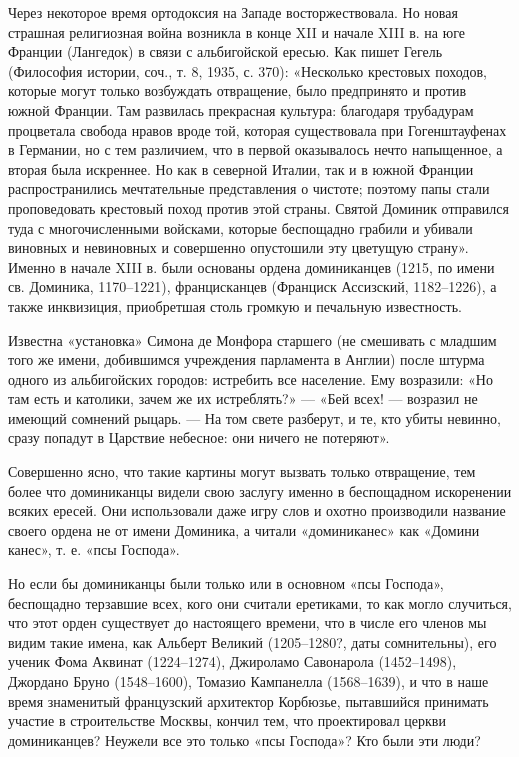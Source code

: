Через некоторое время ортодоксия  на Западе восторжествовала. Но новая
страшная религиозная  война возникла в конце  XII и начале XIII  в. на
юге  Франции  (Лангедок) в  связи  с  альбигойской ересью.  Как  пишет
Гегель  (Философия истории,  соч.,  т. 8,  1935,  с. 370):  «Несколько
крестовых походов,  которые могут  только возбуждать  отвращение, было
предпринято и против южной Франции. Там развилась прекрасная культура:
благодаря  трубадурам процветала  свобода  нравов  вроде той,  которая
существовала при Гогенштауфенах в Германии,  но с тем различием, что в
первой  оказывалось  нечто напыщенное,  а  вторая  была искреннее.  Но
как  в  северной  Италии,  так  и  в  южной  Франции  распространились
мечтательные представления о чистоте; поэтому папы стали проповедовать
крестовый  поход против  этой страны.  Святой Доминик  отправился туда
с  многочисленными  войсками,  которые беспощадно  грабили  и  убивали
виновных и  невиновных и  совершенно опустошили эту  цветущую страну».
Именно в  начале XIII в.  были основаны ордена доминиканцев  (1215, по
имени  св. Доминика,  1170--1221), францисканцев  (Франциск Ассизский,
1182--1226), а также инквизиция, приобретшая столь громкую и печальную
известность.

Известна  «установка»  Симона  де  Монфора старшего  (не  смешивать  с
младшим  того же  имени,  добившимся учреждения  парламента в  Англии)
после штурма одного из  альбигойских городов: истребить все население.
Ему возразили: «Но  там есть и католики, зачем же  их истреблять?» ---
«Бей всех! ---  возразил не имеющий сомнений рыцарь. ---  На том свете
разберут, и те, кто убиты  невинно, сразу попадут в Царствие небесное:
они ничего не потеряют».

Совершенно ясно,  что такие  картины могут вызвать  только отвращение,
тем более  что доминиканцы  видели свою  заслугу именно  в беспощадном
искоренении всяких  ересей. Они использовали  даже игру слов  и охотно
производили  название своего  ордена не  от имени  Доминика, а  читали
«доминиканес» как «Домини канес», т. е. «псы Господа».

Но  если бы  доминиканцы были  только  или в  основном «псы  Господа»,
беспощадно  терзавшие  всех,  кого   они  считали  еретиками,  то  как
могло  случиться, что  этот  орден существует  до настоящего  времени,
что  в   числе  его   членов  мы  видим   такие  имена,   как  Альберт
Великий  (1205--1280?,  даты  сомнительны), его  ученик  Фома  Аквинат
(1224--1274),  Джироламо   Савонарола  (1452--1498),   Джордано  Бруно
(1548--1600),  Томазио Кампанелла  (1568--1639),  и что  в наше  время
знаменитый  французский  архитектор   Корбюзье,  пытавшийся  принимать
участие в  строительстве Москвы,  кончил тем, что  проектировал церкви
доминиканцев? Неужели все это только «псы Господа»? Кто были эти люди?

